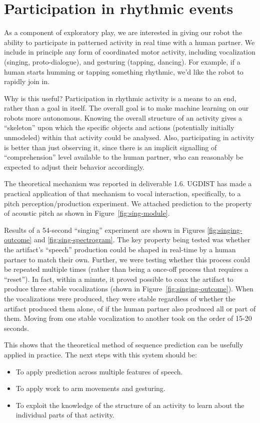 \section{Participation in rhythmic events}

As a component of exploratory play, we are interested in giving our
robot the ability to participate in patterned activity in real time
with a human partner.  We include in principle any form of
coordinated motor activity, including vocalization
(singing, proto-dialogue), and gesturing (tapping, dancing).
%
For example, if a human starts humming or tapping something rhythmic, 
we'd like the robot to rapidly join in.

Why is this useful?  Participation in rhythmic activity is a means to
an end, rather than a goal in itself.  The overall goal is to make
machine learning on our robots more autonomous.
%
Knowing the overall structure of an activity gives a ``skeleton'' upon
which the specific objects and actions (potentially initially
unmodeled) within that activity could be analysed.
%
Also, participating in activity is better than just observing it,
since there is an implicit signalling of ``comprehension'' level
available to the human partner, who can reasonably be expected to
adjust their behavior accordingly.


The theoretical mechanism was reported in deliverable 1.6.  
UGDIST has made a practical application of that mechanism to
vocal interaction, specifically, to a pitch perception/production
experiment.  We attached prediction to the property of acoustic pitch
as shown in Figure~\ref{fig:sing-module}.


Results of a 54-second ``singing'' experiment are shown in 
Figures \ref{fig:singing-outcome} and \ref{fig:sing-spectrogram}. 
%
The key property being tested was whether the artifact's 
``speech'' production could be shaped in real-time by
a human partner to match their own.
%
Further, we were testing whether this process could be
repeated multiple times (rather than being a once-off
process that requires a ``reset'').
%
In fact, within a minute, it proved possible to
coax the artifact to produce three stable vocalizations
(shown in Figure~\ref{fig:singing-outcome}).
%
When the vocalizations were produced, they were stable
regardless of whether the artifact produced them alone,
of if the human partner also produced all or part of them.
%
Moving from one stable vocalization to another 
took on the order of 15-20 seconds.

This shows that the theoretical method of sequence prediction can be
usefully applied in practice.  The next steps with this system should
be:

\begin{itemize}

\item To apply prediction across multiple features of speech.

\item To apply work to arm movements and gesturing.

\item To exploit the knowledge of the structure of an activity to
learn about the individual parts of that activity.

\end{itemize}


